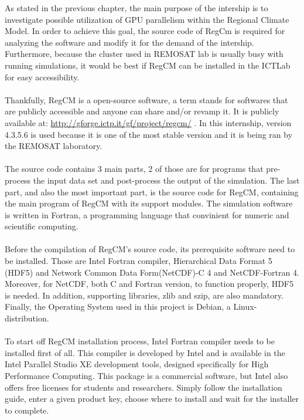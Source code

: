 As stated in the previous chapter, the main purpose of the intership is to investigate possible utilization of GPU parallelism within the Regional Climate Model. In order to achieve this goal, the source code of RegCm is required for analyzing the software and modify it for the demand of the intership. Furthermore, because the cluster used in REMOSAT lab is usually busy with running simulations, it would be best if RegCM can be installed in the ICTLab for easy accessibility. \\
~\\
Thankfully, RegCM is a open-source software, a term stands for softwares that are publicly accessible and anyone can share and/or revamp it. It is publicly available at: \url{http://gforge.ictp.it/gf/project/regcm/} . In this internship, version 4.3.5.6 is used because it is one of the most stable version and it is being ran by the REMOSAT laboratory. \\
~\\
The source code contains 3 main parts, 2 of those are for programs that pre-process the input data set and post-process the output of the simulation. The last part, and also the most important part, is the source code for RegCM, containing the main program of RegCM with its support modules. The simulation software is written in Fortran, a programming language that convinient for numeric and scientific computing. \\
~\\
Before the compilation of RegCM's source code, its prerequisite software need to be installed. Those are Intel Fortran compiler, Hierarchical Data Format 5 (HDF5) and Network Common Data Form(NetCDF)-C 4 and NetCDF-Fortran 4. Moreover, for NetCDF, both C and Fortran version, to function properly, HDF5 is needed. In addition, supporting libraries, zlib and szip, are also mandatory. Finally, the Operating System used in this project is Debian, a Linux-distribution. \\
~\\
To start off RegCM installation process, Intel Fortran compiler needs to be installed first of all. This compiler is developed by Intel and is available in the Intel Parallel Studio XE development tools, designed specifically for High Performance Computing. This package is a commercial software, but Intel also offers free licenses for students and researchers. Simply follow the installation guide, enter a given product key, choose where to install and wait for the installer to complete. \\
